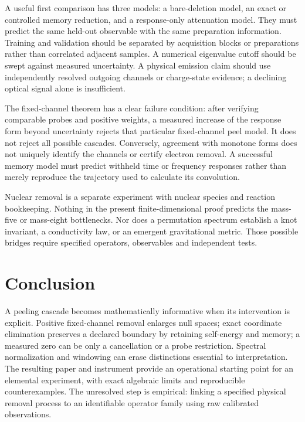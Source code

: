\documentclass[11pt]{article}
\begin{document}
A useful first comparison has three models: a bare-deletion model, an exact or controlled memory reduction, and a response-only attenuation model. They must predict the same held-out observable with the same preparation information. Training and validation should be separated by acquisition blocks or preparations rather than correlated adjacent samples. A numerical eigenvalue cutoff should be swept against measured uncertainty. A physical emission claim should use independently resolved outgoing channels or charge-state evidence; a declining optical signal alone is insufficient.

The fixed-channel theorem has a clear failure condition: after verifying comparable probes and positive weights, a measured increase of the response form beyond uncertainty rejects that particular fixed-channel peel model. It does not reject all possible cascades. Conversely, agreement with monotone forms does not uniquely identify the channels or certify electron removal. A successful memory model must predict withheld time or frequency responses rather than merely reproduce the trajectory used to calculate its convolution.

Nuclear removal is a separate experiment with nuclear species and reaction bookkeeping. Nothing in the present finite-dimensional proof predicts the mass-five or mass-eight bottlenecks. Nor does a permutation spectrum establish a knot invariant, a conductivity law, or an emergent gravitational metric. Those possible bridges require specified operators, observables and independent tests.

\section{Conclusion}
A peeling cascade becomes mathematically informative when its intervention is explicit. Positive fixed-channel removal enlarges null spaces; exact coordinate elimination preserves a declared boundary by retaining self-energy and memory; a measured zero can be only a cancellation or a probe restriction. Spectral normalization and windowing can erase distinctions essential to interpretation. The resulting paper and instrument provide an operational starting point for an elemental experiment, with exact algebraic limits and reproducible counterexamples. The unresolved step is empirical: linking a specified physical removal process to an identifiable operator family using raw calibrated observations.
\end{document}
